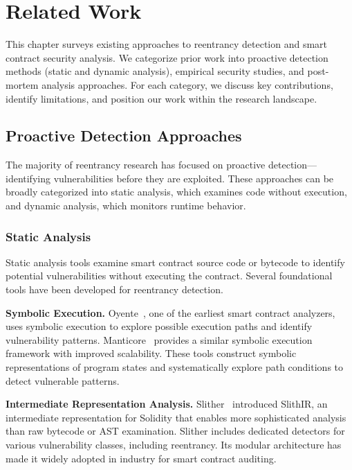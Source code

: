 \chapter{Related Work}
\label{ch:related-work}

This chapter surveys existing approaches to reentrancy detection and smart contract security analysis. We categorize prior work into proactive detection methods (static and dynamic analysis), empirical security studies, and post-mortem analysis approaches. For each category, we discuss key contributions, identify limitations, and position our work within the research landscape.

\section{Proactive Detection Approaches}
\label{sec:rw-proactive}

The majority of reentrancy research has focused on proactive detection---identifying vulnerabilities before they are exploited. These approaches can be broadly categorized into static analysis, which examines code without execution, and dynamic analysis, which monitors runtime behavior.

\subsection{Static Analysis}
\label{sec:rw-static}

Static analysis tools examine smart contract source code or bytecode to identify potential vulnerabilities without executing the contract. Several foundational tools have been developed for reentrancy detection.

\textbf{Symbolic Execution.} Oyente~\cite{oyente}, one of the earliest smart contract analyzers, uses symbolic execution to explore possible execution paths and identify vulnerability patterns. Manticore~\cite{manticore} provides a similar symbolic execution framework with improved scalability. These tools construct symbolic representations of program states and systematically explore path conditions to detect vulnerable patterns.

\textbf{Intermediate Representation Analysis.} Slither~\cite{slither} introduced SlithIR, an intermediate representation for Solidity that enables more sophisticated analysis than raw bytecode or AST examination. Slither includes dedicated detectors for various vulnerability classes, including reentrancy. Its modular architecture has made it widely adopted in industry for smart contract auditing.


